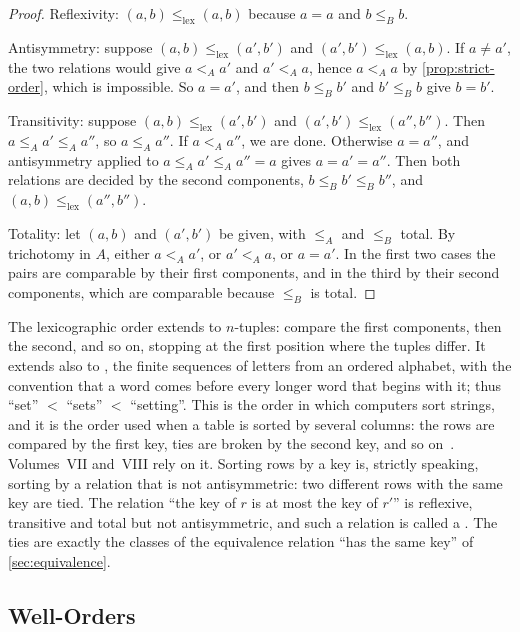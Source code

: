 \begin{proof}
Reflexivity: $(a,b)\le_{\mathrm{lex}}(a,b)$ because $a=a$ and $b\le_Bb$.

Antisymmetry: suppose $(a,b)\le_{\mathrm{lex}}(a',b')$ and $(a',b')\le_{\mathrm{lex}}(a,b)$. If $a\ne a'$, the two relations would give $a<_Aa'$ and $a'<_Aa$, hence $a<_Aa$ by \cref{prop:strict-order}, which is impossible. So $a=a'$, and then $b\le_Bb'$ and $b'\le_Bb$ give $b=b'$.

Transitivity: suppose $(a,b)\le_{\mathrm{lex}}(a',b')$ and $(a',b')\le_{\mathrm{lex}}(a'',b'')$. Then $a\le_Aa'\le_Aa''$, so $a\le_Aa''$. If $a<_Aa''$, we are done. Otherwise $a=a''$, and antisymmetry applied to $a\le_Aa'\le_Aa''=a$ gives $a=a'=a''$. Then both relations are decided by the second components, $b\le_Bb'\le_Bb''$, and $(a,b)\le_{\mathrm{lex}}(a'',b'')$.

Totality: let $(a,b)$ and $(a',b')$ be given, with $\le_A$ and $\le_B$ total. By trichotomy in $A$, either $a<_Aa'$, or $a'<_Aa$, or $a=a'$. In the first two cases the pairs are comparable by their first components, and in the third by their second components, which are comparable because $\le_B$ is total.
\end{proof}

The lexicographic order extends to $n$-tuples: compare the first components, then the second, and so on, stopping at the first position where the tuples differ. It extends also to , the finite sequences of letters from an ordered alphabet, with the convention that a word comes before every longer word that begins with it; thus ``set'' $<$ ``sets'' $<$ ``setting''. This is the order in which computers sort strings, and it is the order used when a table is sorted by several columns: the rows are compared by the first key, ties are broken by the second key, and so on~\cite{knuth1998taocp3}. Volumes~VII and~VIII rely on it. Sorting rows by a key is, strictly speaking, sorting by a relation that is not antisymmetric: two different rows with the same key are tied. The relation ``the key of $r$ is at most the key of $r'$'' is reflexive, transitive and total but not antisymmetric, and such a relation is called a . The ties are exactly the classes of the equivalence relation ``has the same key'' of \cref{sec:equivalence}.

\subsection{Well-Orders}

